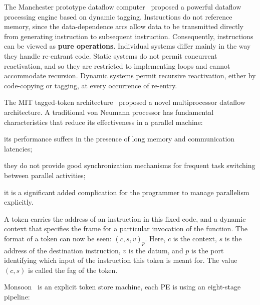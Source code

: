 \documentclass[UTF8,12pt,a4paper]{article}
\begin{document}
The Manchester prototype dataflow computer~\cite{DBLP:journals/cacm/GurdKW85} proposed
a powerful dataflow processing engine based on dynamic tagging.
Instructions do not reference memory, since the data-dependence arcs
allow data to be transmitted directly from generating instruction to subsequent instruction.
Consequently, instructions can be viewed as \textbf{pure operations}.
Individual systems differ mainly in the way they handle re-entrant code.
Static systems do not permit concurrent reactivation,
and so they are restricted to implementing loops and cannot accommodate recursion.
Dynamic systems permit recursive reactivation,
either by code-copying or tagging, at every occurrence of re-entry.

The MIT tagged-token architecture~\cite{DBLP:journals/tc/ArvindN90} proposed
a novel multiprocessor dataflow architecture.
A traditional von Neumann processor has fundamental characteristics
that reduce its effectiveness in a parallel machine:
\begin{compactitem}
  \item its performance suffers in the presence of long memory and communication latencies;
  \item they do not provide good synchronization mechanisms
        for frequent task switching between parallel activities;
  \item it is a significant added complication for the programmer to manage parallelism explicitly.
\end{compactitem}
A token carries the address of an instruction in this fixed code,
and a dynamic context that specifies the frame for a particular invocation of the function.
The format of a token can now be seen: $(c, s, v)_p$.
Here, $c$ is the context, $s$ is the address of the destination instruction, $v$ is the datum,
and $p$ is the port identifying which input of the instruction this token is meant for.
The value $(c, s)$ is called the fag of the token.

Monsoon~\cite{DBLP:conf/isca/PapadopoulosC90} is an explicit token store machine,
each PE is using an eight-stage pipeline:
\end{document}
